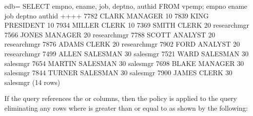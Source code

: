\documentclass[letterpaper,10pt,english,openany,oneside]{sphinxmanual}
\begin{document}
%
\begin{sphinxVerbatim}[commandchars=\\\{\}]
edb=\PYGZsh{} SELECT empno, ename, job, deptno, authid FROM vpemp;
 empno \textbar{} ename  \textbar{}    job    \textbar{} deptno \textbar{}   authid
\PYGZhy{}\PYGZhy{}\PYGZhy{}\PYGZhy{}\PYGZhy{}\PYGZhy{}\PYGZhy{}+\PYGZhy{}\PYGZhy{}\PYGZhy{}\PYGZhy{}\PYGZhy{}\PYGZhy{}\PYGZhy{}\PYGZhy{}+\PYGZhy{}\PYGZhy{}\PYGZhy{}\PYGZhy{}\PYGZhy{}\PYGZhy{}\PYGZhy{}\PYGZhy{}\PYGZhy{}\PYGZhy{}\PYGZhy{}+\PYGZhy{}\PYGZhy{}\PYGZhy{}\PYGZhy{}\PYGZhy{}\PYGZhy{}\PYGZhy{}\PYGZhy{}+\PYGZhy{}\PYGZhy{}\PYGZhy{}\PYGZhy{}\PYGZhy{}\PYGZhy{}\PYGZhy{}\PYGZhy{}\PYGZhy{}\PYGZhy{}\PYGZhy{}\PYGZhy{}\PYGZhy{}
  7782 \textbar{} CLARK  \textbar{} MANAGER   \textbar{}     10 \textbar{}
  7839 \textbar{} KING   \textbar{} PRESIDENT \textbar{}     10 \textbar{}
  7934 \textbar{} MILLER \textbar{} CLERK     \textbar{}     10 \textbar{}
  7369 \textbar{} SMITH  \textbar{} CLERK     \textbar{}     20 \textbar{} researchmgr
  7566 \textbar{} JONES  \textbar{} MANAGER   \textbar{}     20 \textbar{} researchmgr
  7788 \textbar{} SCOTT  \textbar{} ANALYST   \textbar{}     20 \textbar{} researchmgr
  7876 \textbar{} ADAMS  \textbar{} CLERK     \textbar{}     20 \textbar{} researchmgr
  7902 \textbar{} FORD   \textbar{} ANALYST   \textbar{}     20 \textbar{} researchmgr
  7499 \textbar{} ALLEN  \textbar{} SALESMAN  \textbar{}     30 \textbar{} salesmgr
  7521 \textbar{} WARD   \textbar{} SALESMAN  \textbar{}     30 \textbar{} salesmgr
  7654 \textbar{} MARTIN \textbar{} SALESMAN  \textbar{}     30 \textbar{} salesmgr
  7698 \textbar{} BLAKE  \textbar{} MANAGER   \textbar{}     30 \textbar{} salesmgr
  7844 \textbar{} TURNER \textbar{} SALESMAN  \textbar{}     30 \textbar{} salesmgr
  7900 \textbar{} JAMES  \textbar{} CLERK     \textbar{}     30 \textbar{} salesmgr
(14 rows)
\end{sphinxVerbatim}

\newpage

If the query references the  or  columns, then the policy is
applied to the query eliminating any rows where  is greater than or
equal to  as shown by the following:
\end{document}
